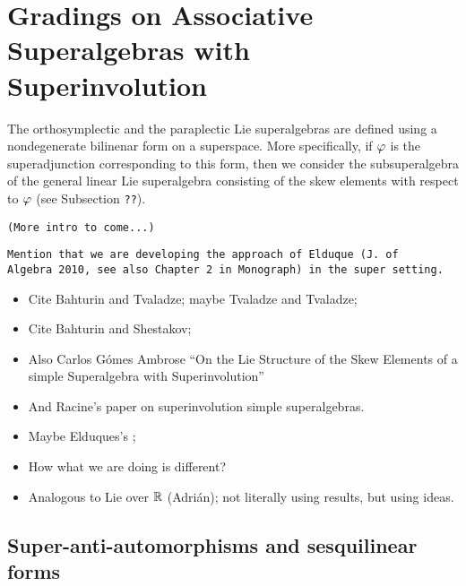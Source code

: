 % 


\chapter{Gradings on Associative Superalgebras with Superinvolution}

The orthosymplectic and the paraplectic Lie superalgebras are defined using a nondegenerate bilinenar form on a superspace. 
More specifically, if $\varphi$ is the superadjunction corresponding to this form, then we consider the subsuperalgebra of the general linear Lie superalgebra consisting of the skew elements with respect to $\varphi$ (see Subsection {\tt ??}). 

\vspace{5mm}
{\tt (More intro to come...)}


{\tt Mention that we are developing the approach of Elduque (J. of \\Al\-ge\-bra 2010, see also Chapter 2 in Monograph) in the super setting.}

\begin{itemize}
    \item Cite Bahturin and Tvaladze; maybe Tvaladze and Tvaladze;
    \item Cite Bahturin and Shestakov;
    \item Also Carlos G\'omes Ambrose ``On the Lie Structure of the Skew Elements of a simple Superalgebra with Superinvolution''
    \item And Racine's paper on superinvolution simple superalgebras.
    \item Maybe Elduques's \cite{elduqueSuperinv};
    \item How what we are doing is different?
    \item Analogous to Lie over $\mathbb{R}$ (Adri\'an); not literally using results, but using ideas.
\end{itemize}


\section{Super-anti-automorphisms and ses\-qui\-li\-near\\ forms}\label{sec:super-anti-auto-and-sesquilinear}

